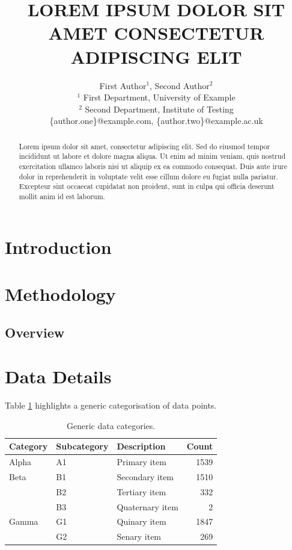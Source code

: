 \documentclass[a4paper, 10pt, twocolumn]{article}
\title{\textbf{LOREM IPSUM DOLOR SIT AMET CONSECTETUR ADIPISCING ELIT}}
\author{
    First Author$^{1}$, Second Author$^{2}$ \\
    \small $^{1}$ First Department, University of Example \\
    \small $^{2}$ Second Department, Institute of Testing \\
    \small \{author.one\}@example.com, \{author.two\}@example.ac.uk
}
\date{} %
\begin{document}
\maketitle

\begin{abstract}
Lorem ipsum dolor sit amet, consectetur adipiscing elit. Sed do eiusmod tempor incididunt ut labore et dolore magna aliqua. Ut enim ad minim veniam, quis nostrud exercitation ullamco laboris nisi ut aliquip ex ea commodo consequat. Duis aute irure dolor in reprehenderit in voluptate velit esse cillum dolore eu fugiat nulla pariatur. Excepteur sint occaecat cupidatat non proident, sunt in culpa qui officia deserunt mollit anim id est laborum.
\end{abstract}

\section{Introduction}
\lipsum[1] %

\section{Methodology}
\subsection{Overview}
\lipsum[2] 

\section{Data Details}
\lipsum[3]

Table \ref{tab:example} highlights a generic categorisation of data points.

\begin{table}[h]
    \centering
    \caption{Generic data categories.}
    \label{tab:example}
    \begin{tabular}{lllr}
        \toprule
        \textbf{Category} & \textbf{Subcategory} & \textbf{Description} & \textbf{Count} \\
        \midrule
        Alpha & A1 & Primary item & 1539 \\
        \midrule
        Beta & B1 & Secondary item & 1510 \\
             & B2 & Tertiary item & 332 \\
             & B3 & Quaternary item & 2 \\
        \midrule
        Gamma & G1 & Quinary item & 1847 \\
              & G2 & Senary item & 269 \\
        \bottomrule
    \end{tabular}
\end{table}
\end{document}
